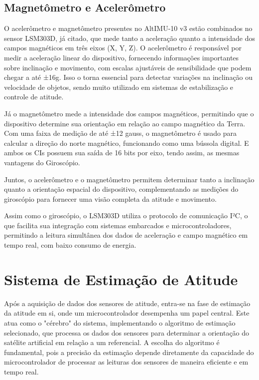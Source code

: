 \documentclass[
	12pt,				%
	openright,			%
	oneside,			%
	a4paper,			%
	english,			%
	brazil				%
	]{abntex2}
\begin{document}
\subsection{Magnetômetro e Acelerômetro}
O acelerômetro e magnetômetro presentes no AltIMU-10 v3 estão combinados no sensor LSM303D, já citado, que mede tanto a aceleração quanto a intensidade dos campos magnéticos em três eixos (X, Y, Z). O acelerômetro é responsável por medir a aceleração linear do dispositivo, fornecendo informações importantes sobre inclinação e movimento, com escalas ajustáveis de sensibilidade que podem chegar a até ±16g. Isso o torna essencial para detectar variações na inclinação ou velocidade de objetos, sendo muito utilizado em sistemas de estabilização e controle de atitude.

Já o magnetômetro mede a intensidade dos campos magnéticos, permitindo que o dispositivo determine sua orientação em relação ao campo magnético da Terra. Com uma faixa de medição de até ±12 gauss, o magnetômetro é usado para calcular a direção do norte magnético, funcionando como uma bússola digital. E ambos os CIs possuem sua saída de 16 bits por eixo, tendo assim, as mesmas vantagens do Giroscópio.

Juntos, o acelerômetro e o magnetômetro permitem determinar tanto a inclinação quanto a orientação espacial do dispositivo, complementando as medições do giroscópio para fornecer uma visão completa da atitude e movimento.

Assim como o giroscópio, o LSM303D utiliza o protocolo de comunicação I²C, o que facilita sua integração com sistemas embarcados e microcontroladores, permitindo a leitura simultânea dos dados de aceleração e campo magnético em tempo real, com baixo consumo de energia.

\section{Sistema de Estimação de Atitude}

Após a aquisição de dados dos sensores de atitude, entra-se na fase de estimação da atitude em si, onde um microcontrolador desempenha um papel central. Este atua como o "cérebro" do sistema, implementando o algoritmo de estimação selecionado, que processa os dados dos sensores para determinar a orientação do satélite artificial em relação a um referencial. A escolha do algoritmo é fundamental, pois a precisão da estimação depende diretamente da capacidade do microcontrolador de processar as leituras dos sensores de maneira eficiente e em tempo real.
\end{document}
